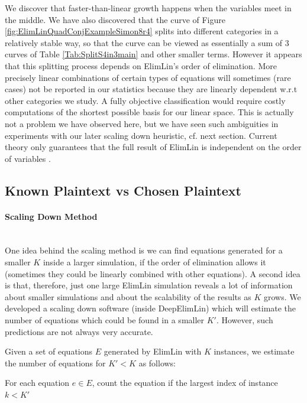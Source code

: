 We discover that faster-than-linear growth happens when the variables meet in the middle. 
We have also discovered that the curve of Figure \ref{fig:ElimLinQuadConjExampleSimon8r4} splits into different  categories in a relatively stable way, so that the curve can be viewed as essentially a sum of 3 curves 
of Table \ref{Tab:SplitS4in3main} and other smaller terms. However it appears that this splitting process depends on ElimLin's order of elimination. 
More precisely linear combinations of certain types of equations will sometimes (rare cases) not be reported in our statistics because they are linearly dependent w.r.t other categories we study. 
A fully objective classification would require costly computations of the shortest possible basis for our linear space. 
This is actually not a problem we have observed here, but we have seen such ambiguities in experiments with our later scaling down heuristic, cf. next section. Current theory only guarantees that the full result of ElimLin is independent on the order of variables \cite{ElimLinRevisit}. 

\subsection{Known Plaintext vs Chosen Plaintext}
\paragraph{Scaling Down Method} \mbox{} \\
One idea behind the scaling method is we can find equations generated for a smaller $K$ inside a larger simulation, if the order of elimination allows it (sometimes they could be linearly combined with other equations). A second idea is that, therefore, just one large ElimLin simulation reveals a lot of information about smaller simulations and about the scalability of the results as $K$ grows. We developed a scaling down software (inside DeepElimLin) which will estimate the number of equations which could be found in a smaller $K'$. However, such predictions are not always very accurate. 

Given a set of equations $E$ generated by ElimLin with $K$ instances, we estimate the number of equations for $K' < K$ as follows:

For each equation $e \in E$, count the equation if the largest index of instance $k < K'$ 
 
